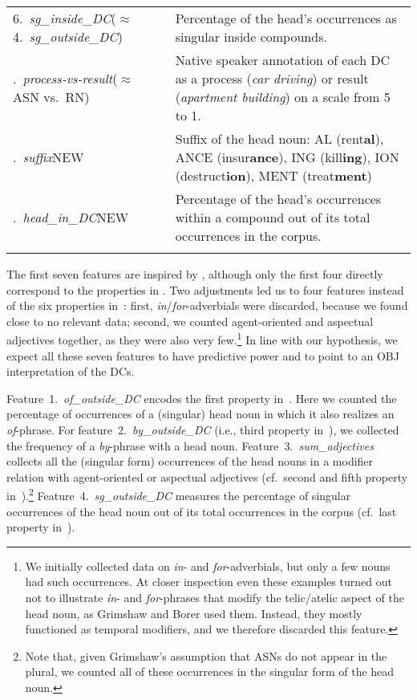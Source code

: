 \documentclass[output=paper]{langsci/langscibook}
\begin{document}
\begin{table}
\begin{tabularx}{\textwidth}{p{3.25cm}Q}
6.\ \textit{sg\_inside\_DC}\newline($\approx$ 4.~\textit{sg\_outside\_DC}) & Percentage of the head's occurrences as singular inside compounds.\\.\ \textit{process-vs-result}\newline($\approx$ ASN vs.~RN) & Native speaker annotation of each DC as a process (\textit{car driving}) or result (\textit{apartment building})  on a scale from 5 to 1.\\.\ \textit{suffix}\newline NEW & Suffix of the head noun: AL (rent\textbf{al}), ANCE (insur\textbf{ance}), ING (kill\textbf{ing}), ION (destruct\textbf{ion}), MENT (treat\textbf{ment})\\.\ \textit{head\_in\_DC}\newline NEW & Percentage of the head's occurrences within a compound out of its total occurrences in the corpus.\\ \lspbottomrule
\end{tabularx}
\end{table}


The first seven features are inspired by \cite{grimshaw:90},  {although only the first four directly correspond to the properties in . Two adjustments led us to four features instead of the six properties in~: first, \textit{in}/\textit{for}-adverbials were discarded, because we found close to no relevant data; second, we counted agent-oriented and aspectual adjectives together, as they were also very few.}\footnote{We initially collected data on \textit{in}- and \textit{for}-adverbials, but only a few nouns had such occurrences. At closer inspection even these examples turned out not to illustrate \textit{in}- and \textit{for}-phrases that modify the telic/atelic aspect of the head noun, as Grimshaw and Borer used them. Instead, they mostly functioned as temporal modifiers, and we therefore discarded this feature.}  In line with our hypothesis, we expect all these seven features to have predictive power and to point to an OBJ interpretation of the DCs.

Feature~1.~\textit{of\_outside\_DC} encodes the first property in~. Here we counted the percentage of occurrences of a (singular) head noun in which it also realizes an  \textit{of}-phrase. For feature~2.~\textit{by\_outside\_DC} (i.e., third property in~), we collected the frequency of a \textit{by}-phrase with a head noun. 
 Feature~3.~\textit{sum\_adjectives} collects all the (singular form) occurrences of the head nouns in a modifier relation with agent-oriented or aspectual adjectives (cf.~second and fifth property in~).\footnote{Note that, given Grimshaw's assumption that ASNs do not appear in the plural, we counted all of these occurrences in the singular form of the head noun.} Feature~4.~\textit{sg\_outside\_DC} measures the percentage of singular occurrences of the head noun out of its total occurrences in the corpus  {(cf.~last property in~)}. 
\end{document}
